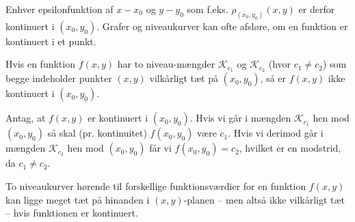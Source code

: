 Enhver epsilonfunktion af  $x-x_{0}$ og $y-y_{0}$ som f.eks. $\rho_{(x_{0}, y_{0})}(x,y)$ er derfor kontinuert i $(x_{0}, y_{0})$.
Grafer og niveaukurver kan ofte afsløre, om en funktion er kontinuert i et punkt.

\begin{theorem} \label{thmInspektionNiveau}
Hvis en funktion $f(x,y)$ har to niveau-mængder $\mathcal{K}_{c_{1}}$ og $\mathcal{K}_{c_{2}}$ (hvor $c_{1} \neq c_{2}$) som begge indeholder punkter $(x,y)$ vilkårligt tæt på $(x_{0}, y_{0})$, så er $f(x,y)$ ikke kontinuert i $(x_{0}, y_{0})$.
\end{theorem}
\begin{bevis}
Antag, at $f(x,y)$ er kontinuert i $(x_{0}, y_{0})$. Hvis vi går i mængden  $\mathcal{K}_{c_{1}}$ hen mod $(x_{0}, y_{0})$ så skal (pr. kontinuitet) $f(x_{0}, y_{0})$ være $c_{1}$. Hvis vi derimod går i mængden  $\mathcal{K}_{c_{2}}$ hen mod $(x_{0}, y_{0})$ får vi $f(x_{0}, y_{0}) = c_{2}$, hvilket er en modstrid, da $c_{1} \neq c_{2}$.
\end{bevis}

\begin{aha}
To niveaukurver hørende til forskellige funktionsværdier for en funktion $f(x,y)$ kan ligge meget tæt på hinanden i $(x, y)$-planen -- men altså ikke vilkårligt tæt -- hvis funktionen er kontinuert.
\end{aha}

